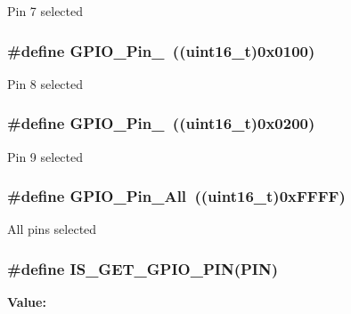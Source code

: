 \label{group__GPIO__pins__define_ga7346b6ce5507bd28a7a79e7dcc816c08}
Pin 7 selected \hypertarget{group__GPIO__pins__define_gac891f0984dc64af3567577fbf13ab304}{
\subsubsection[{GPIO\_\-Pin\_\-8}]{\setlength{\rightskip}{0pt plus 5cm}\#define GPIO\_\-Pin\_~((uint16\_\-t)0x0100)}}
\label{group__GPIO__pins__define_gac891f0984dc64af3567577fbf13ab304}
Pin 8 selected \hypertarget{group__GPIO__pins__define_gaad1891082d5d6bcac06c2729a9fdd2f0}{
\subsubsection[{GPIO\_\-Pin\_\-9}]{\setlength{\rightskip}{0pt plus 5cm}\#define GPIO\_\-Pin\_~((uint16\_\-t)0x0200)}}
\label{group__GPIO__pins__define_gaad1891082d5d6bcac06c2729a9fdd2f0}
Pin 9 selected \hypertarget{group__GPIO__pins__define_gaba3e915ddca17a1211edc07b7fd97e8b}{
\subsubsection[{GPIO\_\-Pin\_\-All}]{\setlength{\rightskip}{0pt plus 5cm}\#define GPIO\_\-Pin\_\-All~((uint16\_\-t)0xFFFF)}}
\label{group__GPIO__pins__define_gaba3e915ddca17a1211edc07b7fd97e8b}
All pins selected \hypertarget{group__GPIO__pins__define_gaddf7154b7f30b7c0a70f3aeaff5ddffc}{
\subsubsection[{IS\_\-GET\_\-GPIO\_\-PIN}]{\setlength{\rightskip}{0pt plus 5cm}\#define IS\_\-GET\_\-GPIO\_\-PIN(PIN)}}
\label{group__GPIO__pins__define_gaddf7154b7f30b7c0a70f3aeaff5ddffc}
{\bfseries Value:}
